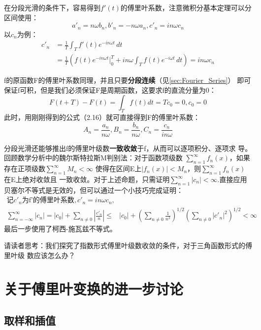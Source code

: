 \documentclass{ctexbook}
\begin{document}
在分段光滑的条件下，容易得到$f'(t)$的傅里叶系数，注意微积分基本定理可以分区间使用：
\begin{equation}
    a'_n=n\omega b_n,b'_n=-n\omega a_n,c'_n=in\omega c_n
\end{equation}
以$c_n$为例：
\begin{align*}
    c'_n & =\frac{1}{T}\int_{T}f'(t)e^{-in\omega t}\,dt                                               \\
         & =\frac{1}{T}(f(t)e^{-in\omega t}|_0^T+in\omega\int_{T}f(t)e^{-i\omega t}\,dt)=in\omega c_n
\end{align*}

f的原函数F的傅里叶系数同理，并且只要\textbf{分段连续}（见\ref{sec:Fourier_Series}）
即可保证f可积，但是我们必须保证F是周期函数，这要求f的直流分量为0：
\[F(t+T)-F(t)=\int_{T}f(t)dt=Tc_0=0,c_0=0\]
此时，用刚刚得到的公式（2.16）就可直接得到F的傅里叶系数：
\begin{equation}
    A_n=\frac{a_n}{n\omega},B_n=\frac{b_n}{n\omega},C_n=\frac{c_n}{in\omega}
\end{equation}

分段光滑还能够推出f的傅里叶级数\textbf{一致收敛}于f，从而可以逐项积分、逐项求
导。回顾数学分析中的魏尔斯特拉斯M判别法：对于函数项级数
$\sum_{n=1}^{\infty}f_n(x)$，如果存在正项级数$\sum_{n=1}^{\infty}M_n<\infty$
使得在区间E上$|f_n(x)|<M_n$，则$\sum_{n=1}^{\infty}f_n(x)$在E上绝对收敛且
一致收敛。对于上述命题，只需证明$\sum_{n=1}^{\infty}|c_n|<\infty$.直接应用
贝塞尔不等式是无效的，但可以通过一个小技巧完成证明：
\begin{align*}
    \text{记}c'_n\text{为f'的傅里叶系数},c'_n =in\omega c_n,                            &                                                                                \\
    \sum_{n=-\infty}^{\infty}|c_n|=   |c_0|+\sum_{n\neq 0}| \frac{c'_n}{n}|\leq & |c_0|+(\sum_{n\neq 0}\frac{1}{n^2})^{1/2}(\sum_{n\neq 0}|c'_n|^2)^{1/2}<\infty
\end{align*}
最后一步使用了柯西-施瓦兹不等式。

请读者思考：我们探究了指数形式傅里叶级数收敛的条件，对于三角函数形式的傅里叶级
数应该怎么办？

\chapter{关于傅里叶变换的进一步讨论}

\section{取样和插值}\label{sec:Sampling and Interpolation}
\end{document}
